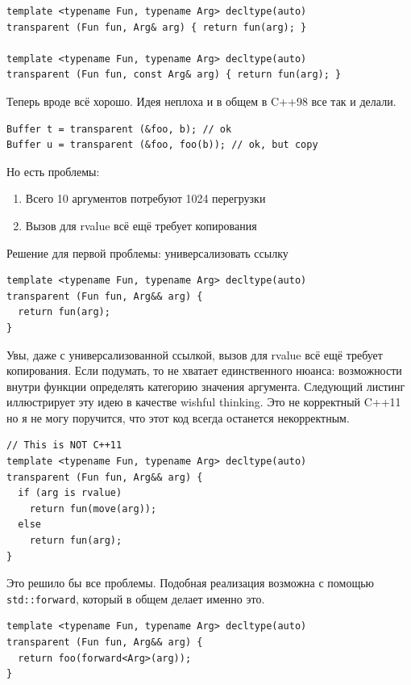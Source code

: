 \documentclass[a4paper,12pt,oneside]{book}
\begin{document}
\begin{lstlisting}
template <typename Fun, typename Arg> decltype(auto)
transparent (Fun fun, Arg& arg) { return fun(arg); }

template <typename Fun, typename Arg> decltype(auto)
transparent (Fun fun, const Arg& arg) { return fun(arg); }
\end{lstlisting}

Теперь вроде всё хорошо. Идея неплоха и в общем в C++98 все так и делали.

\begin{lstlisting}
Buffer t = transparent (&foo, b); // ok
Buffer u = transparent (&foo, foo(b)); // ok, but copy
\end{lstlisting}

Но есть проблемы: 

\begin{enumerate}
\item Всего 10 аргументов потребуют 1024 перегрузки
\item Вызов для rvalue всё ещё требует копирования
\end{enumerate}

Решение для первой проблемы: универсализовать ссылку

\begin{lstlisting}
template <typename Fun, typename Arg> decltype(auto)
transparent (Fun fun, Arg&& arg) {
  return fun(arg);
}
\end{lstlisting}

Увы, даже с универсализованной ссылкой, вызов для rvalue всё ещё требует копирования. Если подумать, то не хватает единственного нюанса: возможности внутри функции определять категорию значения аргумента. Следующий листинг иллюстрирует эту идею в качестве wishful thinking. Это не корректный C++11 но я не могу поручится, что этот код всегда останется некорректным.

\begin{lstlisting}
// This is NOT C++11
template <typename Fun, typename Arg> decltype(auto)
transparent (Fun fun, Arg&& arg) {
  if (arg is rvalue)
    return fun(move(arg));
  else
    return fun(arg);
}
\end{lstlisting}

Это решило бы все проблемы. Подобная реализация возможна с помощью \lstinline!std::forward!, который в общем делает именно это.

\begin{lstlisting}
template <typename Fun, typename Arg> decltype(auto)
transparent (Fun fun, Arg&& arg) {
  return foo(forward<Arg>(arg));
}
\end{lstlisting}
\end{document}
